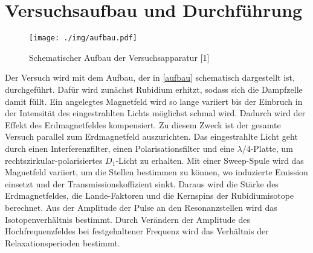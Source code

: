 \section{Versuchsaufbau und Durchführung}

\begin{figure}[h]
\centering
\texttt{[image: ./img/aufbau.pdf]}
\caption{Schematischer Aufbau der Versuchsapparatur [1]}
\label{aufbau}
\end{figure}

Der Versuch wird mit dem Aufbau, der in \autoref{aufbau} schematisch dargestellt ist, durchgeführt. Dafür wird zunächst
Rubidium erhitzt, sodass sich die Dampfzelle damit füllt. Ein angelegtes Magnetfeld wird so lange variiert bis der Einbruch
in der Intensität des eingestrahlten Lichts möglichst schmal wird. Dadurch wird der Effekt des Erdmagnetfeldes kompensiert.
Zu diesem Zweck ist der gesamte Versuch parallel zum Erdmagnetfeld auszurichten. Das eingestrahlte Licht geht durch einen
Interferenzfilter, einen Polarisationsfilter und eine $\lambda/4$-Platte, um rechtszirkular-polarisiertes $D_1$-Licht zu
erhalten. Mit einer Sweep-Spule wird das Magnetfeld variiert, um die Stellen bestimmen zu können, wo induzierte Emission
einsetzt und der Transmissionskoffizient sinkt. Daraus wird die Stärke des Erdmagnetfeldes, die Lande-Faktoren und die
Kernspins der Rubidiumisotope berechnet. Aus der Amplitude der Pulse an den Resonanzstellen wird das Isotopenverhältnis
bestimmt. Durch Verändern der Amplitude des Hochfrequenzfeldes bei festgehaltener Frequenz wird das Verhältnis der
Relaxationsperioden bestimmt.
